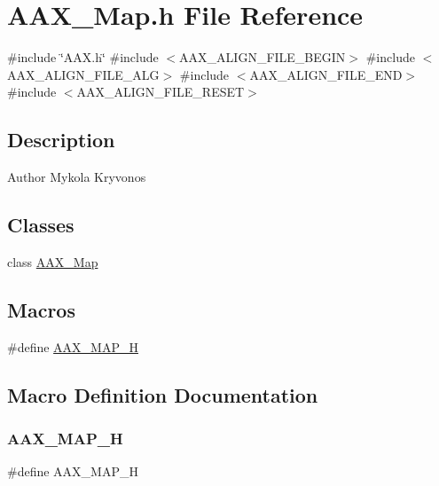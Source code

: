 \hypertarget{a00767}{}\section{A\+A\+X\+\_\+\+Map.\+h File Reference}
\label{a00767}
{\ttfamily \#include \char`\"{}A\+A\+X.\+h\char`\"{}}\newline
{\ttfamily \#include $<$A\+A\+X\+\_\+\+A\+L\+I\+G\+N\+\_\+\+F\+I\+L\+E\+\_\+\+B\+E\+G\+IN$>$}\newline
{\ttfamily \#include $<$A\+A\+X\+\_\+\+A\+L\+I\+G\+N\+\_\+\+F\+I\+L\+E\+\_\+\+A\+LG$>$}\newline
{\ttfamily \#include $<$A\+A\+X\+\_\+\+A\+L\+I\+G\+N\+\_\+\+F\+I\+L\+E\+\_\+\+E\+ND$>$}\newline
{\ttfamily \#include $<$A\+A\+X\+\_\+\+A\+L\+I\+G\+N\+\_\+\+F\+I\+L\+E\+\_\+\+R\+E\+S\+ET$>$}\newline


\subsection{Description}
\begin{DoxyAuthor}{Author}
Mykola Kryvonos 
\end{DoxyAuthor}
\subsection*{Classes}
\begin{DoxyCompactItemize}
\item 
class \mbox{\hyperlink{a01981}{A\+A\+X\+\_\+\+Map}}
\end{DoxyCompactItemize}
\subsection*{Macros}
\begin{DoxyCompactItemize}
\item 
\#define \mbox{\hyperlink{a00767_a3537bee52a550093f02a1880d4e314d1}{A\+A\+X\+\_\+\+M\+A\+P\+\_\+H}}
\end{DoxyCompactItemize}


\subsection{Macro Definition Documentation}
\mbox{\label{a00767_a3537bee52a550093f02a1880d4e314d1}} 
\subsubsection{\texorpdfstring{AAX\_MAP\_H}{AAX\_MAP\_H}}
{\footnotesize\ttfamily \#define A\+A\+X\+\_\+\+M\+A\+P\+\_\+H}

